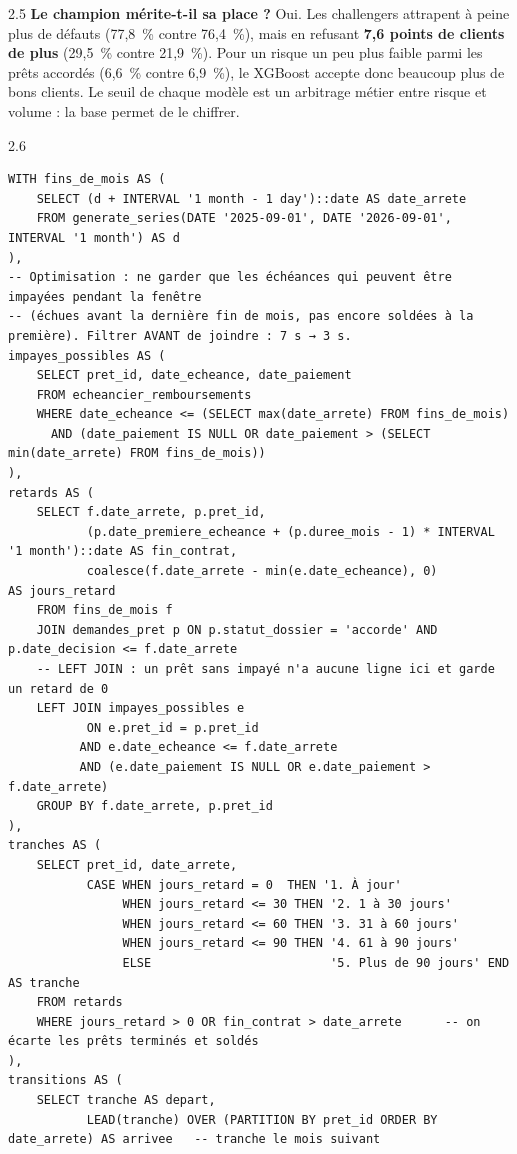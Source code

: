 \begin{correction}{2.5}
\textbf{Le champion mérite-t-il sa place ?} Oui. Les challengers attrapent à peine plus de défauts
(77,8~\% contre 76,4~\%), mais en refusant \textbf{7,6 points de clients de plus} (29,5~\% contre
21,9~\%). Pour un risque un peu plus faible parmi les prêts accordés (6,6~\% contre 6,9~\%), le
XGBoost accepte donc beaucoup plus de bons clients. Le seuil de chaque modèle est un arbitrage métier
entre risque et volume : la base permet de le chiffrer.
\end{correction}

\begin{correction}{2.6}
\begin{lstlisting}[style=long]
WITH fins_de_mois AS (
    SELECT (d + INTERVAL '1 month - 1 day')::date AS date_arrete
    FROM generate_series(DATE '2025-09-01', DATE '2026-09-01', INTERVAL '1 month') AS d
),
-- Optimisation : ne garder que les échéances qui peuvent être impayées pendant la fenêtre
-- (échues avant la dernière fin de mois, pas encore soldées à la première). Filtrer AVANT de joindre : 7 s → 3 s.
impayes_possibles AS (
    SELECT pret_id, date_echeance, date_paiement
    FROM echeancier_remboursements
    WHERE date_echeance <= (SELECT max(date_arrete) FROM fins_de_mois)
      AND (date_paiement IS NULL OR date_paiement > (SELECT min(date_arrete) FROM fins_de_mois))
),
retards AS (
    SELECT f.date_arrete, p.pret_id,
           (p.date_premiere_echeance + (p.duree_mois - 1) * INTERVAL '1 month')::date AS fin_contrat,
           coalesce(f.date_arrete - min(e.date_echeance), 0)                           AS jours_retard
    FROM fins_de_mois f
    JOIN demandes_pret p ON p.statut_dossier = 'accorde' AND p.date_decision <= f.date_arrete
    -- LEFT JOIN : un prêt sans impayé n'a aucune ligne ici et garde un retard de 0
    LEFT JOIN impayes_possibles e
           ON e.pret_id = p.pret_id
          AND e.date_echeance <= f.date_arrete
          AND (e.date_paiement IS NULL OR e.date_paiement > f.date_arrete)
    GROUP BY f.date_arrete, p.pret_id
),
tranches AS (
    SELECT pret_id, date_arrete,
           CASE WHEN jours_retard = 0  THEN '1. À jour'
                WHEN jours_retard <= 30 THEN '2. 1 à 30 jours'
                WHEN jours_retard <= 60 THEN '3. 31 à 60 jours'
                WHEN jours_retard <= 90 THEN '4. 61 à 90 jours'
                ELSE                         '5. Plus de 90 jours' END AS tranche
    FROM retards
    WHERE jours_retard > 0 OR fin_contrat > date_arrete      -- on écarte les prêts terminés et soldés
),
transitions AS (
    SELECT tranche AS depart,
           LEAD(tranche) OVER (PARTITION BY pret_id ORDER BY date_arrete) AS arrivee   -- tranche le mois suivant

\end{lstlisting}
\end{correction}
